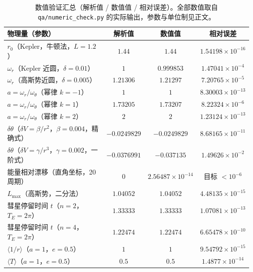 \documentclass[UTF8,a4paper,11pt]{ctexart}
\begin{document}
\begin{table}[htbp]
\centering
\small
\begin{tabular}{p{6.0cm}ccc}
\toprule
物理量（参数） & 解析值 & 数值值 & 相对误差 \\
\midrule
$r_0$（Kepler，牛顿法，$L=1.2$） & $1.44$ & $1.44$ & $1.54198\times10^{-16}$ \\
$\omega_r$（Kepler 近圆，$\delta=0.01$） & $1$ & $0.999853$ & $1.47041\times10^{-4}$ \\
$\omega_r$（高斯势近圆，$\delta=0.005$） & $1.21306$ & $1.21297$ & $7.20765\times10^{-5}$ \\
$a=\omega_r/\omega_\theta$（幂律 $k=-1$） & $1$ & $1$ & $8.30003\times10^{-13}$ \\
$a=\omega_r/\omega_\theta$（幂律 $k=1$） & $1.73205$ & $1.73207$ & $8.22324\times10^{-6}$ \\
$a=\omega_r/\omega_\theta$（幂律 $k=2$） & $2$ & $2$ & $1.23124\times10^{-13}$ \\
$\delta\theta$（$\delta V=\beta/r^2$，$\beta=0.004$，精确式） & $-0.0249829$ & $-0.0249829$ & $8.68165\times10^{-11}$ \\
$\delta\theta$（$\delta V=\gamma/r^3$，$\gamma=0.002$，一阶式） & $-0.0376991$ & $-0.037135$ & $1.49626\times10^{-2}$ \\
能量相对漂移（直角坐标，20 周期） & $0$ & $2.56487\times10^{-14}$ & 目标 $<10^{-6}$ \\
$L_{\max}$（高斯势，二分法） & $1.04052$ & $1.04052$ & $4.48135\times10^{-15}$ \\
彗星停留时间 $t$（$n=2$，$T_E=2\pi$） & $1.33333$ & $1.33333$ & $1.07081\times10^{-13}$ \\
彗星停留时间 $t$（$n=4$，$T_E=2\pi$） & $1.22474$ & $1.22474$ & $6.65478\times10^{-10}$ \\
$\langle 1/r\rangle$（$a=1$，$e=0.5$） & $1$ & $1$ & $9.54792\times10^{-15}$ \\
$\langle T\rangle$（$a=1$，$e=0.5$） & $0.5$ & $0.5$ & $1.4877\times10^{-14}$ \\
\bottomrule
\end{tabular}
\caption{数值验证汇总（解析值 / 数值值 / 相对误差）。全部数值取自
\texttt{qa/numeric\_check.py} 的实际输出，参数与单位制见正文。}
\label{tab:numeric}
\end{table}
\end{document}
